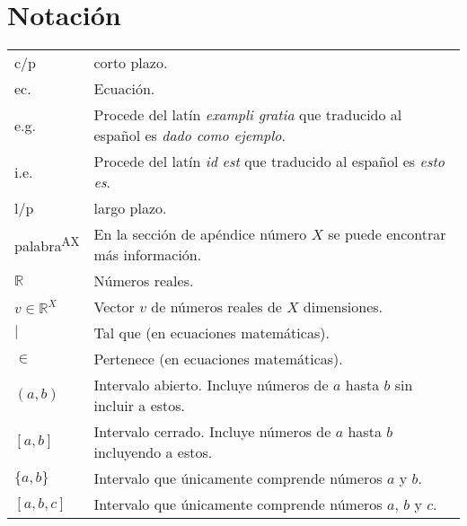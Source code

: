 \newpage

\thispagestyle{fancy}

\section*{Notación}

\begin{longtable}{l p{13.7cm}}
c/p & corto plazo.\\
ec. & Ecuación.\\
e.g. & Procede del latín \textit{exampli gratia} que traducido al español es \textit{dado como ejemplo}.\\
i.e. & Procede del latín \textit{id est} que traducido al español es \textit{esto es}.\\
l/p & largo plazo.\\
palabra\textsuperscript{AX} & En la sección de apéndice número $X$ se puede encontrar más información.\\
$\mathbb{R}$ & Números reales.\\
$v \in \mathbb{R}^X$ & Vector $v$ de números reales de $X$ dimensiones.\\
$|$ & Tal que (en ecuaciones matemáticas).\\
$\in$ & Pertenece (en ecuaciones matemáticas).\\
$(a,b)$ & Intervalo abierto. Incluye números de $a$ hasta $b$ sin incluir a estos.\\
$[a,b]$ & Intervalo cerrado. Incluye números de $a$ hasta $b$ incluyendo a estos.\\
$\{a,b\}$ & Intervalo que únicamente comprende números $a$ y $b$.\\
$[a,b,c]$ & Intervalo que únicamente comprende números $a$, $b$ y $c$.\\
\end{longtable}



